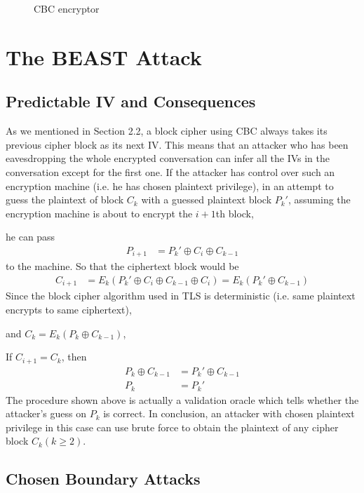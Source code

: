 \documentclass{acm_proc_article-sp}
\begin{document}
\begin{figure}[htb]
  \centering
  
  \caption{CBC encryptor}
  \label{fig:cbc-encryptor}
\end{figure}

\section{The BEAST Attack}
\subsection{Predictable IV and Consequences}
As we mentioned in Section 2.2, a block cipher using CBC always takes its previous cipher block as
its next IV. This means that an attacker who has been eavesdropping the whole encrypted
conversation can infer all the IVs in the conversation except for the first one.
If the attacker has control over such an encryption machine (i.e. he has chosen plaintext privilege),
in an attempt to guess the plaintext of block $C_k$ with a guessed plaintext block $P_k'$,
assuming the encryption machine is about to encrypt the $i+1$th block,

he can pass
$$
\begin{aligned}
P_{i+1}&=P_k'\oplus C_i\oplus C_{k-1}
\end{aligned}
$$
to the machine. So that the ciphertext block would be
$$
\begin{aligned}
C_{i+1}&=E_k(P_k'\oplus C_i\oplus C_{k-1}\oplus C_i)=E_k(P_k'\oplus C_{k-1})
\end{aligned}
$$
Since the block cipher algorithm used in TLS is deterministic
(i.e. same plaintext encrypts to same ciphertext),

and $C_k = E_k(P_k\oplus C_{k-1})$,

If $C_{i+1} = C_k$, then
$$
\begin{aligned}
P_k\oplus C_{k-1}&= P_k'\oplus C_{k-1}\\
P_k&= P_k'
\end{aligned}
$$
The procedure shown above is actually a validation oracle which tells whether the attacker's guess
on $P_k$ is correct. In conclusion, an attacker with chosen plaintext privilege in this case can use
brute force to obtain the plaintext of any cipher block $C_k(k\geq 2)$.
\subsection{Chosen Boundary Attacks}
\end{document}
